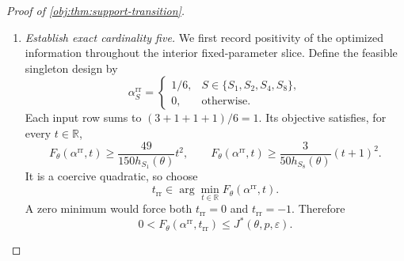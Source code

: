 \begin{proof}[Proof of \cref{obj:thm:support-transition}]
\begin{enumerate}
For the certificate weights, the mixture representation gives
\[
F_\theta(\alpha^{(5)},t)
=\lambda(\alpha^{(5)})B_5(t)
 +(1-\lambda(\alpha^{(5)}))T_5(t).
\]
Its stationarity consequently implies
\[
\lambda(\alpha^{(5)})B_5'(t_{\mathrm{cert},5})
 +(1-\lambda(\alpha^{(5)}))T_5'(t_{\mathrm{cert},5})=0.
\]
The derivative difference is nonzero: if the two derivatives were equal, this equation would force \(T_5'(t_{\mathrm{cert},5})=0\). Solving gives
\[
\lambda(\alpha^{(5)})
=-\frac{T_5'(t_{\mathrm{cert},5})}
 {B_5'(t_{\mathrm{cert},5})-T_5'(t_{\mathrm{cert},5})}.
\]
For any feasible optimal \(\beta\), the preceding support-rigidity argument applies, and
\[
F_\theta(\beta,t_{\mathrm{cert},5})
=J^*=\inf_tF_\theta(\beta,t).
\]
Hence \(\beta\) is stationary at the same coordinate and satisfies the same mixture equation. Thus
\[
\lambda(\beta)=\lambda(\alpha^{(5)}),
\qquad
\beta=\alpha^{(5)}.
\]
This proves the required uniqueness among all feasible optimal weights.

\item \emph{Establish exact cardinality five.}
We first record positivity of the optimized information throughout the interior fixed-parameter slice. Define the feasible singleton design by
\[
\alpha^{\mathrm{rr}}_S=
\begin{cases}
1/6,&S\in\{S_1,S_2,S_4,S_8\},\\
0,&\text{otherwise}.
\end{cases}
\]
Each input row sums to \((3+1+1+1)/6=1\). Its objective satisfies, for every \(t\in\mathbb R\),
\[
F_\theta(\alpha^{\mathrm{rr}},t)
\ge\frac{49}{150h_{S_1}(\theta)}t^2,
\qquad
F_\theta(\alpha^{\mathrm{rr}},t)
\ge\frac{3}{50h_{S_8}(\theta)}(t+1)^2.
\]
It is a coercive quadratic, so choose
\[
t_{\mathrm{rr}}\in\arg\min_{t\in\mathbb R}
F_\theta(\alpha^{\mathrm{rr}},t).
\]
A zero minimum would force both \(t_{\mathrm{rr}}=0\) and
\(t_{\mathrm{rr}}=-1\). Therefore
\[
0<F_\theta(\alpha^{\mathrm{rr}},t_{\mathrm{rr}})
\le J^*(\theta,p,\varepsilon).
\]


\end{enumerate}
\end{proof}
